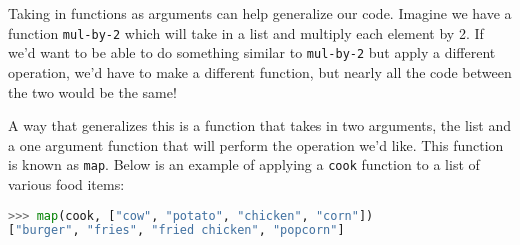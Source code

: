 Taking in functions as arguments can help generalize our code. Imagine we have a function \texttt{mul-by-2} which will take in a list and multiply each element by 2. If we'd want to be able to do something similar to \texttt{mul-by-2} but apply a different operation, we'd have to make a different function, but nearly all the code between the two would be the same!

A way that generalizes this is a function that takes in two arguments, the list and a one argument function that will perform the operation we'd like. This function is known as \texttt{map}. Below is an example of applying a \texttt{cook} function to a list of various food items:
\vspace{2mm}
\begin{lstlisting}[language=Python]
>>> map(cook, ["cow", "potato", "chicken", "corn"])
["burger", "fries", "fried chicken", "popcorn"]
\end{lstlisting}


